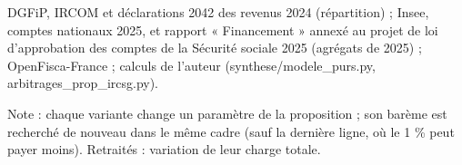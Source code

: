 DGFiP, IRCOM et déclarations 2042 des revenus 2024 (répartition) ; Insee, comptes nationaux 2025, et rapport « Financement » annexé au projet de loi d'approbation des comptes de la Sécurité sociale 2025 (agrégats de 2025) ; OpenFisca-France ; calculs de l'auteur (synthese/modele\_purs.py, arbitrages\_prop\_ircsg.py).\par Note : chaque variante change un paramètre de la proposition ; son barème est recherché de nouveau dans le même cadre (sauf la dernière ligne, où le 1 \% peut payer moins). Retraités : variation de leur charge totale.
